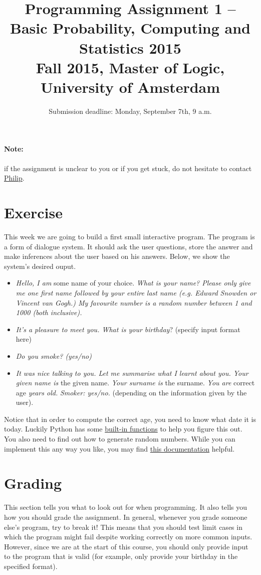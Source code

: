 \documentclass[11pt, leqno, a4paper]{article}
\title{Programming Assignment 1 -- Basic Probability, Computing and Statistics 2015 \\[2mm]
\large{Fall 2015, Master of Logic, University of Amsterdam}}
\author{}
\date{Submission deadline: Monday, September 7th, 9 a.m.}
\begin{document}
\maketitle

\paragraph{Note:} if the assignment is unclear to you or if you get stuck, do not hesitate to contact \href{mailto:P.Schulz@uva.nl}{Philip}.

\section{Exercise}
This week we are going to build a first small interactive program. The program is a form of dialogue system. It should ask the user questions,
store the answer and make inferences about the user based on his answers. Below, we show the system's desired ouput. 
\begin{itemize}
\item \textit{Hello, I am} some name of your choice. \textit{What is
    your name? Please only give me one first name followed by your
    entire last name (e.g. \emph{Edward Snowden} or \emph{Vincent van Gogh}.) My favourite number
    is \emph{a random number between 1 and 1000 (both inclusive)}.}
\item \textit{It's a pleasure to meet you. What is your birthday}? (specify input format here)
\item \textit{Do you smoke? (yes/no)}
\item \textit{It was nice talking to you. Let me summarise what I learnt about you. Your given name is} the given name. \textit{Your surname is}
the surname. \textit{You are} correct age \textit{years old.} 
\textit{Smoker: yes/no.} (depending on the information given by the user).
\end{itemize}

Notice that in order to compute the correct age, you need to know what date it is today. Luckily
Python has some \href{https://docs.python.org/3/library/datetime.html}{built-in functions} to help
you figure this out. You also need to find out how to generate random numbers. While you can implement
this any way you like, you may find \href{https://docs.python.org/3/library/random.html}{this documentation} helpful.

\section{Grading}
This section tells you what to look out for when programming. It also tells you how you should grade the assignment. In general, whenever you grade 
someone else's program, try to break it! This means that you should test limit cases in which the program might fail despite working correctly
on more common inputs. However, since we are at the start of this course, you should only provide input
to the program that is valid (for example, only provide your birthday in the specified format).
\end{document}
